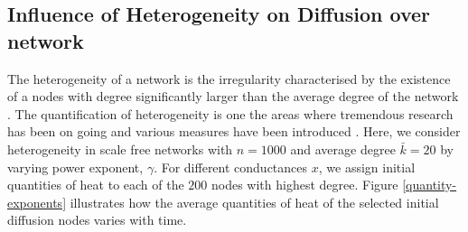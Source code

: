\documentclass[10pt,a4paper]{article}
\begin{document}
     \subsection{Influence of Heterogeneity on Diffusion over network}
     The heterogeneity of a network is the irregularity characterised by the existence of a nodes with degree significantly larger than the average degree of the network \cite{estrada2010quantifying,albert2002statistical,newman2003structure}.
     The quantification of heterogeneity is one the areas where tremendous research has been on going and various measures have been introduced \cite{estrada2010quantifying}.
     Here, we consider heterogeneity in scale free networks with $n=1000$ and average degree $\bar{k}=20$ by varying power exponent, $\gamma$. For different conductances $x$, we assign initial quantities of heat to each of the $200$ nodes with highest degree. Figure \ref{quantity-exponents} illustrates how the average quantities of heat of the selected initial diffusion nodes varies with time.
\end{document}
